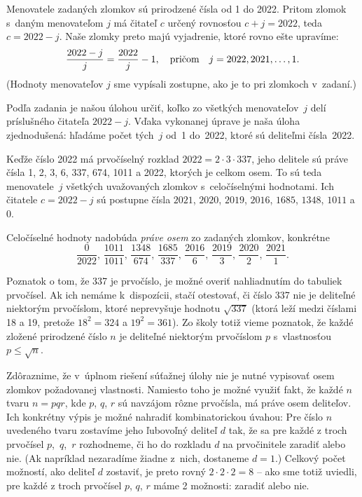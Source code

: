 {%
Menovatele zadaných zlomkov sú prirodzené čísla od 1 do
2022. Pritom zlomok s~daným menovateľom $j$ má čitateľ $c$ určený
rovnosťou $c+j=2022$, teda $c=2022-j$. Naše zlomky preto majú
vyjadrenie, ktoré rovno ešte upravíme:
$$
\frac{2022-j}{j}=\frac{2022}{j}-1,\quad\hbox{pričom}\quad j=2022,2021,\dots,1.
$$
(Hodnoty menovateľov $j$ sme vypísali zostupne, ako je to
pri zlomkoch v~zadaní.)

Podľa zadania je našou úlohou určiť,
koľko zo všetkých menovateľov~$j$ delí príslušného čitateľa $2022-j$.
Vďaka vykonanej úprave je naša úloha zjednodušená: hľadáme počet tých~$j$
od~1 do~2022, ktoré sú deliteľmi čísla~2022.

Keďže číslo 2022 má prvočíselný rozklad $2022=2\cdot3\cdot337$,
jeho delitele sú práve čísla 1, 2, 3, 6, 337, 674, 1011 a 2022,
ktorých je celkom osem. To sú teda menovatele~$j$ všetkých uvažovaných
zlomkov s~celočíselnými hodnotami. Ich čitatele $c=2022-j$ sú
postupne čísla $2021$, $2020$, $2019$, $2016$, $1685$, $1348$,
$1011$ a $0$.

\zaver
Celočíselné hodnoty nadobúda {\it práve osem\/} zo zadaných
zlomkov, konkrétne
$$
\frac{0}{2022}, \,\frac{1011}{1011}, \,\frac{1348}{674},
\,\frac{1685}{337}, \,\frac{2016}{6}, \,\frac{2019}{3},
\,\frac{2020}{2}, \,\frac{2021}{1}.
$$


\poznamky
Poznatok o tom, že 337 je prvočíslo, je možné overiť nahliadnutím do
tabuliek prvočísel. Ak ich nemáme k~dispozícii, stačí otestovať, či
číslo 337 nie je deliteľné niektorým prvočíslom, ktoré neprevyšuje
hodnotu $\sqrt{337}$ (ktorá leží medzi číslami 18 a 19, pretože
$18^2=324$ a $19^2=361$). Zo školy totiž vieme
poznatok, že každé zložené prirodzené číslo $n$ je deliteľné
niektorým prvočíslom $p$ s~vlastnosťou $p\leq\sqrt{n}$.

Zdôraznime, že v~úplnom riešení súťažnej úlohy nie je nutné
vypisovať osem zlomkov požadovanej vlastnosti. Namiesto toho je možné
využiť fakt, že každé $n$ tvaru $n=pqr$, kde $p$, $q$, $r$ sú
navzájom rôzne prvočísla, má práve osem deliteľov. Ich konkrétny
výpis je možné nahradiť kombinatorickou úvahou: Pre číslo $n$ uvedeného
tvaru zostavíme jeho ľubovoľný deliteľ $d$ tak, že sa pre každé z troch
prvočísel $p$,~$q$,~$r$ rozhodneme, či ho do rozkladu $d$ na
prvočinitele zaradiť alebo nie. (Ak napríklad nezaradíme žiadne z~nich,
dostaneme $d=1$.) Celkový počet možností, ako deliteľ $d$
zostaviť, je preto rovný $2\cdot2\cdot2=8$ -- ako sme totiž uviedli,
pre každé z troch prvočísel $p$, $q$, $r$ máme 2 možnosti:
zaradiť alebo nie.

}
